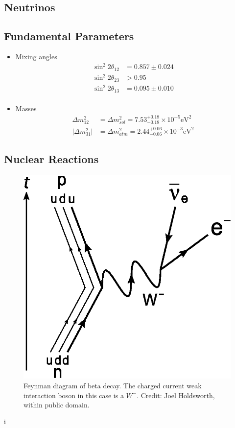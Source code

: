 \documentclass{sciposter}
\begin{document}
\begin{multicols}{3}

\section{Neutrinos}


\subsection{Fundamental Parameters}

\begin{itemize}
\item Mixing angles
\begin{align}
\sin^2 2\theta_{12} & = 0.857 \pm 0.024 \\
\sin^2 2\theta_{23} & > 0.95 \\
\sin^2 2\theta_{13} & = 0.095 \pm 0.010 \\
\end{align}
\item Masses
\begin{align}
\Delta m_{12}^2 &= \Delta m_{sol}^2 = 7.53_{-0.18}^{+0.18} \times 10^{-5} \mathrm{eV}^2 \\
\lvert\Delta m_{31}^2\rvert & = \Delta m_{atm}^2 = 2.44_{-0.06}^{+0.06}\times 10^{-3} \mathrm{eV^2}
\end{align}

\end{itemize}

\subsection{Nuclear Reactions}


\begin{figure}[h]
\centering
\includegraphics[width=\columnwidth]{assets/Beta_Negative_Decay.eps}
\caption{Feynman diagram of beta decay. The charged current weak interaction boson in this case is a $W^-$. Credit: Joel Holdsworth, within public domain.}
\label{fig:Beta_Negative_Decay}
\end{figure}
i


\end{multicols}
\end{document}
